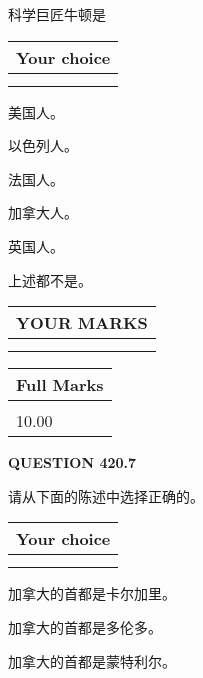 \documentclass{ctexart}
\begin{document}
  
科学巨匠牛顿是
  
  
\noindent\hspace{3.0in} \begin{tabular}{|l|}
\hline
Your choice \\
\hline
 \\ 
 \\ 
\hline
\end{tabular}
  
  
 
 
美国人。
 
 
以色列人。
 
 
法国人。
 
 
加拿大人。
 
 
英国人。
 
 
 上述都不是。
 
 
  
\vspace{0.2in}
  
\noindent\begin{tabular}{|l|}
\hline
 YOUR MARKS  \\
\hline
 \\ 
 \\ 
\hline
\end{tabular}
\hspace{0.05in} \begin{tabular}{|l|}
\hline
 Full Marks  \\
\hline
 \\ 
10.00 \\
\hline
\end{tabular}
{\textbf{\Large{QUESTION
420.7 
}}}
  
  
请从下面的陈述中选择正确的。
  
  
\noindent\hspace{3.0in} \begin{tabular}{|l|}
\hline
Your choice \\
\hline
 \\ 
 \\ 
\hline
\end{tabular}
  
  
 
 
加拿大的首都是卡尔加里。
 
 
加拿大的首都是多伦多。
 
 
加拿大的首都是蒙特利尔。
 
\end{document}
